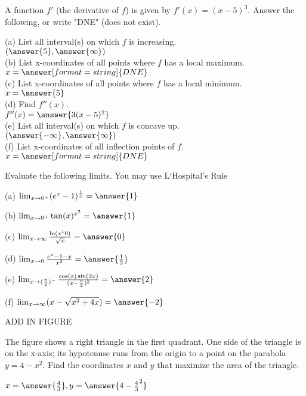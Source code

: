 \documentclass{ximera}
\begin{document}
\begin{exercise}
A function $f'$ (the derivative of $f$) is given by $f'(x)=(x-5)^3$. Answer the following, or write  "DNE" (does not exist).

(a) List all interval(s) on which $f$ is increasing.\\
$(\answer{5},\answer{\infty})$\\

(b) List x-coordinates of all points where $f$ has a local maximum. \\
$x=\answer[format=string]{DNE}$\\

(c)  List x-coordinates of all points where $f$ has a local minimum.\\

$x=\answer{5}$\\

(d) Find  $f''(x)$.\\

$f''(x)=\answer{3(x-5)^2}$\\

(e) List all interval(s) on which $f$ is concave up.\\

$(\answer{-\infty},\answer{\infty})$\\

(f) List x-coordinates of all inflection points of $f$.\\

$x=\answer[format=string]{DNE}$\\

\end{exercise}

\begin{exercise}
Evaluate the following limits.  You may use L`Hospital's Rule

(a) $\lim_{x\to 0^+} (e^x-1)^\frac{1}{x}=\answer{1}$

(b) $\lim_{x\to 0^+} \tan(x)^{x^2}=\answer{1}$

(c) $\lim_{x\to \infty} \frac{\ln(x^10)}{\sqrt{x}}=\answer{0}$

(d) $\lim_{x\to 0} \frac{e^x-1-x}{x^2}=\answer{\frac{1}{2}}$

(e) $\lim_{x\to (\frac{\pi}{2})^-} \frac{\cos(x)\sin(2x)}{(x-\frac{\pi}{2})^2}=\answer{2}$

(f) $\lim_{x\to\infty} (x-\sqrt{x^2+4x})=\answer{-2}$
\end{exercise}

\begin{exercise}

  ADD IN FIGURE

The figure shows a right triangle in the first quadrant.  One side of the triangle is on the x-axis; its hypotenuse runs from the origin to a point on the parabola $y=4-x^2$. Find the coordinates $x$ and $y$ that maximize the area of the triangle.

$x=\answer{\frac{4}{3}}, y=\answer{4-\frac{4}{3}^2}$
\end{exercise}
\end{document}
